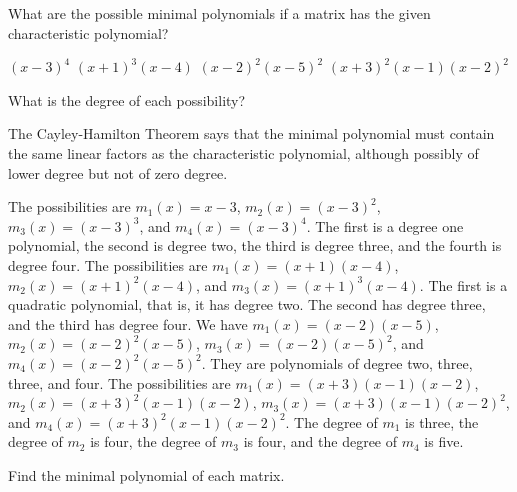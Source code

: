 \begin{exercises}
  \recommended \item 
    What are the possible minimal polynomials if a matrix has
    the given characteristic polynomial?
    \begin{exparts*}
      \partsitem $(x-3)^4$
      \partsitem $(x+1)^3(x-4)$
      \partsitem $(x-2)^2(x-5)^2$
      \partsitem  \( (x+3)^2(x-1)(x-2)^2 \)
    \end{exparts*}
    What is the degree of each possibility?
    \begin{answer} 
      The Cayley-Hamilton Theorem   says that
      the minimal polynomial must contain the same linear factors
      as the characteristic polynomial, although possibly of lower degree
      but not of zero degree.
      \begin{exparts}
        \partsitem The possibilities are 
          $m_1(x)=x-3$, $m_2(x)=(x-3)^2$, $m_3(x)=(x-3)^3$,
          and $m_4(x)=(x-3)^4$.
          The first is a degree one polynomial, the second is degree two,
          the third is degree three, and the fourth is degree four.
        \partsitem The possibilities are $m_1(x)=(x+1)(x-4)$,
          $m_2(x)=(x+1)^2(x-4)$, and $m_3(x)=(x+1)^3(x-4)$.
          The first is a quadratic polynomial, that is, it has degree two.
          The second has degree three, and the third has degree four.
        \partsitem We have $m_1(x)=(x-2)(x-5)$, $m_2(x)=(x-2)^2(x-5)$,
          $m_3(x)=(x-2)(x-5)^2$, and $m_4(x)=(x-2)^2(x-5)^2$.
          They are polynomials of degree two, three, three, and four.
        \partsitem The possibilities are \( m_1(x)=(x+3)(x-1)(x-2) \),
          \( m_2(x)=(x+3)^2(x-1)(x-2) \),
          \( m_3(x)=(x+3)(x-1)(x-2)^2 \),
          and \( m_4(x)=(x+3)^2(x-1)(x-2)^2 \).
          The degree of $m_1$ is three, the degree of $m_2$ is four,
          the degree of $m_3$ is four, and the degree of $m_4$ is five.
      \end{exparts}
    \end{answer}
  \recommended \item 
    Find the minimal polynomial of each matrix.
\end{exercises}
